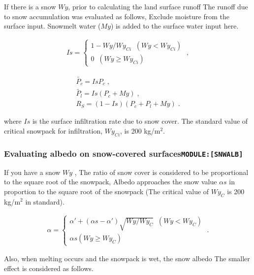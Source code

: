 If there is a snow \(Wy\), prior to calculating the land surface runoff
The runoff due to snow accumulation was evaluated as follows, Exclude
moisture from the surface input. Snowmelt water (\(My\)) is added to the
surface water input here.

\begin{eqnarray}
  Is = \left\{
    \begin{array}{ll}
      1 - Wy / Wy_{Ci}  \;\; ( Wy < Wy_{Ci} ) \\
      0                 \;\; ( Wy \ge Wy_{Ci} )
    \end{array}
  \right. \; ,
\end{eqnarray}

\begin{eqnarray}
  \widetilde{P_c} = Is P_c \; ,\\
  \widetilde{P_l} = Is ( P_c + My ) \; ,\\
  R_S        = ( 1 - Is )( P_c + P_l + My ) \; .
\end{eqnarray}

where \(Is\) is the surface infiltration rate due to snow cover. The
standard value of critical snowpack for infiltration, \(Wy_{Ci}\), is
200 kg/m\(^2\).

\hypertarget{evaluating-albedo-on-snow-covered-surfacesmodulesnwalb}{%
\subsubsection{\texorpdfstring{Evaluating albedo on snow-covered
surfaces\texttt{MODULE:{[}SNWALB{]}}}{Evaluating albedo on snow-covered surfacesMODULE:{[}SNWALB{]}}}\label{evaluating-albedo-on-snow-covered-surfacesmodulesnwalb}}

If you have a snow \(Wy\) , The ratio of snow cover is considered to be
proportional to the square root of the snowpack, Albedo approaches the
snow value \(\alpha s\) in proportion to the square root of the snowpack
(The critical value of \(Wy_C\) is 200 kg/m\(^2\) in standard).

\begin{eqnarray}
  \alpha = \left\{ 
  \begin{array}{ll}
    \alpha' + (\alpha s-\alpha')\sqrt{Wy/Wy_{C}} \;\;   (Wy < Wy_{C}) \\
    \alpha s                                            (Wy \ge Wy_{C})
  \end{array}
  \right. \; .
\end{eqnarray}

Also, when melting occurs and the snowpack is wet, the snow albedo The
smaller effect is considered as follows.

